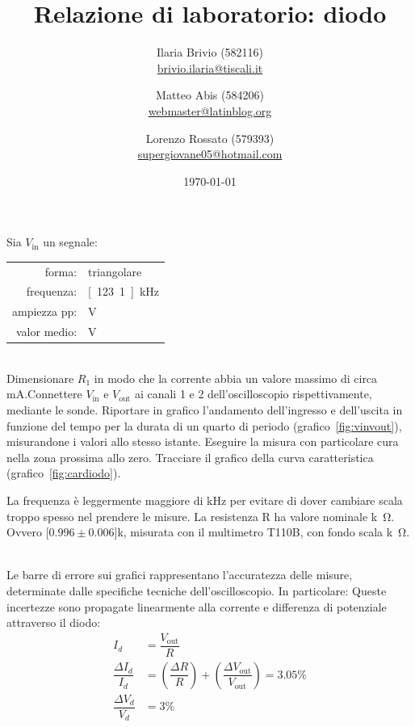 \documentclass[italian,a4paper]{article}
\begin{document}
\title{Relazione di laboratorio: diodo}
\author{\normalsize Ilaria Brivio (582116)\\%
\normalsize \url{brivio.ilaria@tiscali.it}%
\and %
\normalsize Matteo Abis (584206)\\ %
\normalsize \url{webmaster@latinblog.org}
\and %
\normalsize Lorenzo Rossato (579393)\\ %
\normalsize \url{supergiovane05@hotmail.com}}
\date{\today}
\maketitle
\noindent
Sia $V_{\text{in}}$ un segnale:
\begin{table}[h]
    \centering
    \begin{tabular}{rl}
        forma: & triangolare\\
        frequenza: & \unit[123.1]{kHz}\\
        ampiezza pp: & \unit[10]{V}\\
        valor medio: & \unit[0]{V}
    \end{tabular}
\end{table}\\
Dimensionare $R_1$ in modo che la corrente abbia un valore massimo di circa
\unit[5]{mA}.Connettere $V_{\text{in}}$ e $V_{\text{out}}$ ai canali 1 e 2 dell’oscilloscopio
rispettivamente, mediante le sonde. 
Riportare in grafico
l'andamento dell'ingresso e dell'uscita in funzione del tempo per la
durata di un quarto di periodo (grafico~\ref{fig:vinvout}), misurandone i valori allo
stesso istante. Eseguire la misura con particolare cura nella zona
prossima allo zero. Tracciare il grafico della curva caratteristica
(grafico~\ref{fig:cardiodo}).

La frequenza è leggermente maggiore di \unit[100]{kHz} per evitare di dover cambiare scala troppo spesso nel
prendere le misure.  La resistenza R ha valore nominale \unit[1]{k\ohm}. Ovvero \unit[$0.996\pm0.006$]{k\ohm}, misurata con il multimetro T110B, con fondo
scala \unit[2]{k\ohm}.
\begin{figure}[h]
    \begin{center}
        
    \end{center}
\end{figure}\\
Le barre di errore sui grafici rappresentano l'accuratezza delle misure,
determinate dalle specifiche tecniche dell'oscilloscopio. In particolare:
Queste incertezze sono propagate linearmente alla corrente e differenza di
potenziale attraverso il diodo:
\begin{align*}
    I_d &= \dfrac{V_{\text{out}}}{R}\\
    \dfrac{\Delta{I_d}}{I_d} &= \left(\dfrac{\Delta R}{R}\right) + \left(\dfrac{\Delta
    V_\text{out}}{V_\text{out}}\right) = 3.05\%\\
    \dfrac{\Delta{V_d}}{V_d} &= 3\%\\
\end{align*}  
\newpage
\end{document}
